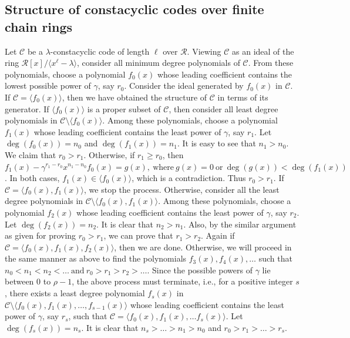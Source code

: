 \documentclass[12pt,a4paper]{article}
\begin{document}
\subsection{Structure of constacyclic codes over finite chain rings}\label{subsec:one}
Let $\mathcal{C}$ be a $\lambda$-constacyclic code of length $\ell$ over $\mathcal{R}$. Viewing $\mathcal{C}$ as an ideal of the ring $\mathcal{R}[x]/ \langle x^{\ell}- \lambda \rangle$, consider all minimum degree polynomials of $\mathcal{C}$. From these polynomials, choose a polynomial $f_0(x)$ whose leading coefficient contains the lowest possible power of $\gamma$, say $r_0$. Consider the ideal generated by $f_0(x)$ in $\mathcal{C}$. If $\mathcal{C}= \langle f_0(x) \rangle$, then we have obtained the structure of $\mathcal{C}$ in terms of its generator. If $\langle f_0(x) \rangle$ is a proper subset of $\mathcal{C}$, then consider all least degree polynomials in $\mathcal{C} \setminus \langle f_0(x) \rangle$. Among these polynomials, choose a polynomial $f_1(x)$ whose leading coefficient contains the least power of $\gamma$, say $r_1$. Let $\deg(f_0(x))=n_0$ and $\deg(f_1(x))=n_1$. It is easy to see that $n_1>n_0$. We claim that $r_0>r_1$. Otherwise, if $r_1 \geq r_0$, then $f_1(x)-\gamma^{r_1-r_0}x^{n_1-n_0}f_0(x)=g(x), ~\text{where}~ g(x)=0 ~\text{or}~\deg(g(x))<\deg(f_1(x))$. In both cases, $f_1(x)\in \langle f_0(x) \rangle$, which is a contradiction. Thus $r_0 > r_1$. If $\mathcal{C}= \langle f_0(x),f_1(x) \rangle$, we stop the process. Otherwise, consider all the least degree polynomials in $\mathcal{C} \setminus \langle f_0(x),f_1(x) \rangle$. Among these polynomials, choose a polynomial $f_2(x)$ whose leading coefficient contains the least power of $\gamma$, say $r_2$. Let $\deg(f_2(x))=n_2$. It is clear that $n_2>n_1$. Also, by the similar argument as given for proving $r_0>r_1$, we can prove that $r_1>r_2$. Again if $\mathcal{C}= \langle f_0(x),f_1(x),f_2(x)\rangle$, then we are done. Otherwise, we will proceed in the same manner as above to find the polynomials $f_3(x),f_4(x), \dots$ such that $n_0<n_1<n_2< \dots ~\text{and}~ r_0>r_1>r_2> \dots$. Since the possible powers of $\gamma$ lie between $0$ to $\rho-1$, the above process must terminate, i.e., for a positive integer $s$, there exists a least degree polynomial $f_s(x)$ in $\mathcal{C} \setminus \langle f_0(x),f_1(x), \dots, f_{s-1}(x) \rangle$ whose leading coefficient contains the least power of $\gamma$, say $r_s$, such that  $\mathcal{C}= \langle f_0(x),f_1(x),\dots f_s(x) \rangle$. Let $\deg(f_s(x))=n_s$. It is clear that $n_s>\dots >n_1>n_0$ and $r_0>r_1> \dots >r_s$.
\end{document}

